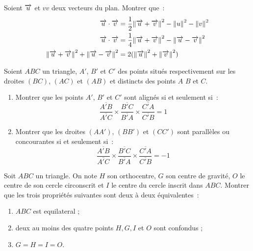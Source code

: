 \begin{exercice}
    Soient \(\overrightarrow{u}\) et \(vv\) deux vecteurs du plan. Montrer que~:
    \begin{align}
        \overrightarrow{u} \cdot \overrightarrow{v} &= \frac{1}{2}{\left\lVert\overrightarrow{u} + \overrightarrow{v}\right\rVert^2 - \left\lVert u\right\rVert^2 - 
        \left\lVert v\right\rVert^2} \\
        \overrightarrow{u} \cdot \overrightarrow{v} &= \frac{1}{4}{\left\lVert\overrightarrow{u} + \overrightarrow{v}\right\rVert^2 - \left\lVert\overrightarrow{u} - \overrightarrow{v}\right\rVert^2} 
        \\
        \left\lVert\overrightarrow{u} + \overrightarrow{v}\right\rVert^2 + \left\lVert\overrightarrow{u} - \overrightarrow{v}\right\rVert^2 &= 2(\left\lVert\overrightarrow{u}\right\rVert^2 + 
        \left\lVert\overrightarrow{v}\right\rVert^2)
    \end{align}
\end{exercice}

\begin{exercice}
    Soient \(ABC\) un triangle, \(A'\), \(B'\) et \(C'\) des points situés 
    respectivement sur les droites \((BC)\), \((AC)\) et \((AB)\) et distincts 
    des points \(A\) \(B\) et \(C\).
    \begin{enumerate}
        \item Montrer que les points \(A'\), \(B'\) et \(C'\) sont alignés si et 
            seulement si~:
            \begin{equation}
                \frac{\overline{A'B}}{\overline{A'C}} \times 
                \frac{\overline{B'C}}{\overline{B'A}} \times 
                \frac{\overline{C'A}}{\overline{C'B}} = 1
            \end{equation}
        \item Montrer que les droites \((AA')\), \((BB')\) et \((CC')\) sont 
            parallèles ou concourantes si et seulement si~: 
            \begin{equation}
                \frac{\overline{A'B}}{\overline{A'C}} \times 
                \frac{\overline{B'C}}{\overline{B'A}} \times 
                \frac{\overline{C'A}}{\overline{C'B}} = -1
            \end{equation}
    \end{enumerate}
\end{exercice}

\begin{exercice}
    Soit \(ABC\) un triangle. On note \(H\) son orthocentre, \(G\) son centre de 
    gravité, \(O\) le centre de son cercle circonscrit et \(I\) le centre du 
    cercle inscrit dans \(ABC\). Montrer que les trois propriétés suivantes sont 
    deux à deux équivalentes~:
    \begin{enumerate}
        \item \(ABC\) est equilateral ;
        \item deux au moins des quatre points \(H, G, I\) et \(O\) sont 
            confondus ;
        \item \(G = H = I = O\).
    \end{enumerate}
\end{exercice}

